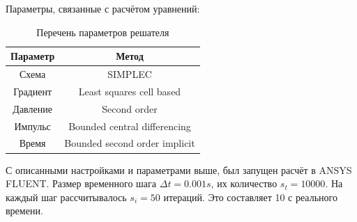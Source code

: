 	Параметры, связанные с расчётом уравнений:
	\begin{table}[H]
		\begin{center}
			\begin{tabular}{|c|c|}
				\hline
				Параметр & Метод\\
				\hline
				Схема & SIMPLEC \\
				\hline
				Градиент & Least squares cell based\\
				\hline
				Давление & Second order\\
				\hline
				Импульс & Bounded central differencing\\
				\hline
				Время & Bounded second order implicit\\
				\hline
			\end{tabular}
		\end{center}
		\caption{Перечень параметров решателя}
	\end{table}
	
	С описанными настройками и параметрами выше, был запущен расчёт в ANSYS FLUENT. Размер временного шага $\Delta t = 0.001 s$, их количество $s_t = 10000$. На каждый шаг рассчитывалось $s_i = 50$ итераций. Это составляет 10 с реального времени.